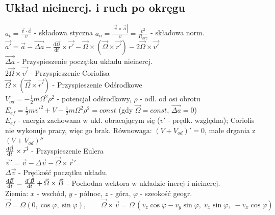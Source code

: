 \documentclass[10pt,a4paper,twocolumn]{article}
\begin{document}
\subsection{Układ nieinercj. i ruch po okręgu}
$a_t = \frac{\vec v \cdot \vec a}{v}$ - składowa styczna 
$a_n = \frac{\left|\vec v\times \vec a\right|}{v} = \frac{v^2}{R_{krz}}$ - składowa norm. \\
$\vec{a'} = \vec{a} - \vec{\Delta a} - \frac{\text{d}\vec{\Omega}}{\text{d}t} \times \vec{r'} - \vec{\Omega} \times \left(\vec{\Omega} \times \vec{r'}\right) - 2\vec{\Omega}\times \vec{v'}$ \\
$\vec{\Delta a}$ - Przyspieszenie początku układu nieinercj. \\
$2\vec{\Omega}\times \vec{v'}$ - Przyspieszenie Coriolisa \\
$\vec{\Omega} \times \left(\vec{\Omega} \times \vec{r'}\right)$ - Przyspieszenie Odśrodkowe \\
$V_{od} = -\frac12 m\Omega^2\rho^2$ - potencjał odśrodkowy, $\rho$ - odl. od osi obrotu \\
$E_{ef} = \frac12 m v'^2 + V - \frac12 m\Omega^2\rho^2 = const$ (gdy $\vec\Omega = const$, $\vec{\Delta a} = 0$) \\
$E_{ef}$ - energia zachowana w ukł. obracającym się ($v'$ - prędk. względna); Coriolis nie wykonuje pracy, więc go brak. Równowaga: $(V+V_{od})' = 0$, małe drgania z $(V+V_{od})''$ \\
$\frac{\text d \vec{\Omega}}{\text dt} \times \vec{r'}$ - Przyspieszenie Eulera \\
$\vec v' = \vec v - \Delta \vec v - \vec\Omega \times \vec r'$ \\
$\Delta \vec v$ - Prędkość początku układu. \\
$\frac{\text d\vec B}{\text d t} = \frac{\text d' \vec B}{\text d t} + \vec \Omega \times \vec B$ - Pochodna wektora w układzie inercj i nieinercj.\\
Ziemia: $x$ - wschód, $y$ - północ, $z$ - góra, $\varphi$ - szeokość geogr.\\
$\vec\Omega = \Omega(0,\cos\varphi,\sin\varphi), \qquad \vec\Omega\times\vec v = \Omega\,(v_z\cos\varphi - v_y\sin\varphi,\; v_x\sin\varphi,\; -v_x\cos\varphi)$
\end{document}
